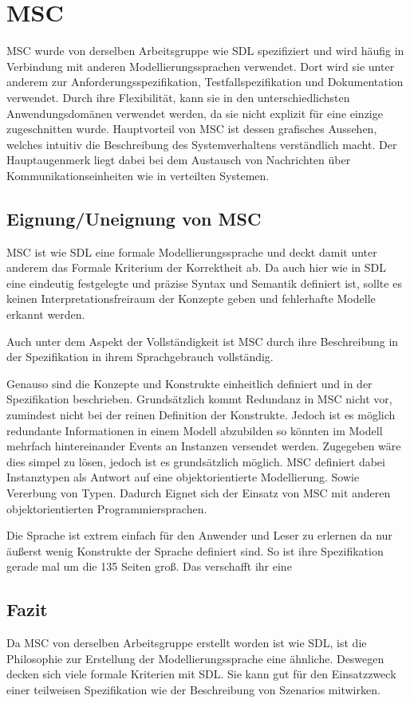 \section{MSC}
\label{sc:MSCB}
\ac{MSC} wurde von derselben Arbeitsgruppe wie \ac{SDL} spezifiziert und wird häufig in Verbindung mit anderen Modellierungssprachen verwendet. Dort wird sie unter anderem zur Anforderungsspezifikation, Testfallspezifikation und Dokumentation verwendet. Durch ihre Flexibilität, kann sie in den unterschiedlichsten Anwendungsdomänen verwendet werden, da sie nicht explizit für eine einzige zugeschnitten wurde. Hauptvorteil von \ac{MSC} ist dessen grafisches Aussehen, welches intuitiv die Beschreibung des Systemverhaltens verständlich macht. Der Hauptaugenmerk liegt dabei bei dem Austausch von Nachrichten über Kommunikationseinheiten wie in verteilten Systemen.
\subsection{Eignung/Uneignung von MSC}
\label{sc:MSCEignung}
\ac{MSC} ist wie \ac{SDL} eine formale Modellierungssprache und deckt damit unter anderem das Formale Kriterium der Korrektheit  ab. Da auch hier wie in \ac{SDL} eine eindeutig festgelegte und präzise Syntax und Semantik definiert ist, sollte es keinen Interpretationsfreiraum der Konzepte geben und fehlerhafte Modelle erkannt werden.

Auch unter dem Aspekt der Vollständigkeit ist \ac{MSC} durch ihre Beschreibung in der Spezifikation in ihrem Sprachgebrauch vollständig.

Genauso sind die Konzepte und Konstrukte einheitlich definiert und in der Spezifikation beschrieben. Grundsätzlich kommt Redundanz in \ac{MSC} nicht vor, zumindest nicht bei der reinen Definition der Konstrukte. Jedoch ist es möglich redundante Informationen in einem Modell abzubilden so könnten im Modell mehrfach hintereinander Events an Instanzen versendet werden. Zugegeben wäre dies simpel zu lösen, jedoch ist es grundsätzlich möglich.
MSC definiert dabei Instanztypen als Antwort auf eine objektorientierte Modellierung. Sowie Vererbung von Typen. Dadurch Eignet sich der Einsatz von \ac{MSC} mit anderen objektorientierten Programmiersprachen.

Die Sprache ist extrem einfach für den Anwender und Leser zu erlernen da nur äußerst wenig Konstrukte der Sprache definiert sind. So ist ihre Spezifikation gerade mal um die 135 Seiten groß. Das verschafft ihr eine
\subsection{Fazit}
\label{sc:MSCFazit}
Da \ac{MSC} von derselben Arbeitsgruppe erstellt worden ist wie \ac{SDL}, ist die Philosophie zur Erstellung der Modellierungssprache eine ähnliche. Deswegen decken sich viele formale Kriterien mit \ac{SDL}. Sie kann gut für den Einsatzzweck einer teilweisen Spezifikation wie der Beschreibung von Szenarios mitwirken.

